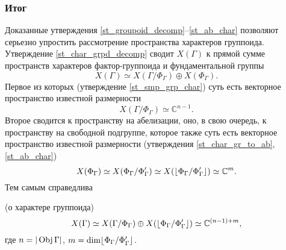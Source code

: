 \subsubsection{Итог}
Доказанные утверждения \ref{st_groupoid_decomp}--\ref{st_ab_char} 
позволяют серьезно упростить рассмотрение пространства характеров группоида.
Утверждение \ref{st_char_grpd_decomp} сводит $X(\Gamma)$ к прямой сумме 
пространств характеров фактор-группоида и фундаментальной группы 
\[X(\Gamma) \simeq X(\Gamma/\Phi_\Gamma)\oplus X(\Phi_\Gamma).\] 
Первое из которых (утверждение \ref{st_smp_grp_char}) суть есть векторное 
пространство известной размерности
\[X(\Gamma/\Phi_\Gamma) \simeq \mathbb{C}^{n-1}.\]
Второе сводится к пространству на абелизации, оно, в свою очередь, к 
пространству на свободной подгруппе, которое также суть есть векторное 
пространство известной размерности (утверждения \ref{st_char_gr_to_ab}, 
\ref{st_ab_char})
    \[X(\Phi_\Gamma) \simeq X(\Phi_\Gamma/\Phi_\Gamma') 
    \simeq X(\lfloor \Phi_\Gamma / \Phi_\Gamma' \rfloor) \simeq \mathbb{C}^m.\]
Тем самым справедлива
\begin{theorem} (о характере группоида)
    \[X(\Gamma) \simeq X(\Gamma/\Phi_\Gamma) 
    \oplus X(\lfloor \Phi_\Gamma / \Phi_\Gamma' \rfloor) \simeq \mathbb{C}^{(n-1)+m},\]
    где $n = | \operatorname*{Obj} \Gamma |$, $m = \dim \lfloor \Phi_\Gamma / \Phi_\Gamma' \rfloor$.
\end{theorem}